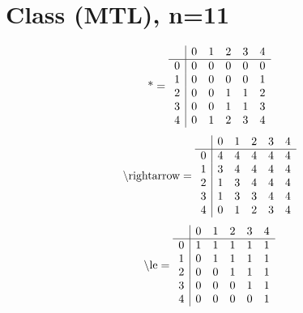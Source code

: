 \documentclass[11pt]{article}
\begin{document}
\section{Class (MTL), n=11}
\[\text{*} = 
\begin{array}{r | r r r r r}
 & 0 & 1 & 2 & 3 & 4 \\ \hline
0 & 0 & 0 & 0 & 0 & 0 \\
1 & 0 & 0 & 0 & 0 & 1 \\
2 & 0 & 0 & 1 & 1 & 2 \\
3 & 0 & 0 & 1 & 1 & 3 \\
4 & 0 & 1 & 2 & 3 & 4 \\
\end{array}
\]
\[\text{\textbackslash rightarrow} = 
\begin{array}{r | r r r r r}
 & 0 & 1 & 2 & 3 & 4 \\ \hline
0 & 4 & 4 & 4 & 4 & 4 \\
1 & 3 & 4 & 4 & 4 & 4 \\
2 & 1 & 3 & 4 & 4 & 4 \\
3 & 1 & 3 & 3 & 4 & 4 \\
4 & 0 & 1 & 2 & 3 & 4 \\
\end{array}
\]
\[\text{\textbackslash le} = 
\begin{array}{r | r r r r r}
 & 0 & 1 & 2 & 3 & 4 \\ \hline
0 & 1 & 1 & 1 & 1 & 1 \\
1 & 0 & 1 & 1 & 1 & 1 \\
2 & 0 & 0 & 1 & 1 & 1 \\
3 & 0 & 0 & 0 & 1 & 1 \\
4 & 0 & 0 & 0 & 0 & 1 \\
\end{array}
\]
\end{document}
